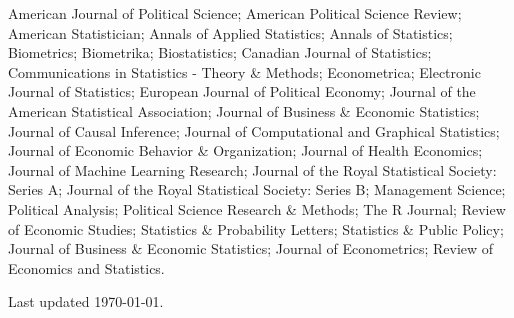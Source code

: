 \documentclass[10pt,letterpaper]{article}
\newenvironment{infolist}{
	\begin{list}{}{
		\setlength{\parskip}{0pt}
		\setlength{\itemsep}{4pt}
		\setlength{\parsep}{0.3em}
		\setlength{\leftmargin}{0em}
		\setlength{\labelwidth}{0em}
		}
	}{
\end{list}
}
\newcommand{\infoitem}[1]{\item {#1}}
\begin{document}
	\begin{infolist}
		\infoitem{American Journal of Political Science; American Political Science Review; American Statistician; Annals of Applied Statistics; Annals of Statistics; Biometrics; Biometrika; Biostatistics; Canadian Journal of Statistics; Communications in Statistics - Theory \& Methods; Econometrica; Electronic Journal of Statistics; European Journal of Political Economy; Journal of the American Statistical Association; Journal of Business \& Economic Statistics; Journal of Causal Inference; Journal of Computational and Graphical Statistics; Journal of Economic Behavior \& Organization; Journal of Health Economics; Journal of Machine Learning Research; Journal of the Royal Statistical Society: Series A; Journal of the Royal Statistical Society: Series B; Management Science; Political Analysis; Political Science Research \& Methods; The R Journal; Review of Economic Studies; Statistics \& Probability Letters; Statistics \& Public Policy; Journal of Business \& Economic Statistics; Journal of Econometrics; Review of Economics and Statistics.}
	\end{infolist}

	\bigskip
	{\small Last updated \today.}
\end{document}

